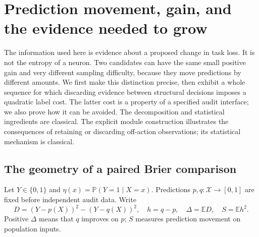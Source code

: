 \section{Prediction movement, gain, and the evidence needed to grow}
\label{sec:movement-theory}

The information used here is evidence about a proposed change in task loss.
It is not the entropy of a neuron. Two candidates can have the same small
positive gain and very different sampling difficulty, because they move
predictions by different amounts. We first make this distinction precise,
then exhibit a whole sequence for which discarding evidence between
structural decisions imposes a quadratic label cost. The latter cost is a
property of a specified audit interface; we also prove how it can be avoided.
The decomposition and statistical ingredients are classical. The explicit module construction illustrates the consequences of retaining
or discarding off-action observations; its statistical mechanism is classical.

\subsection{The geometry of a paired Brier comparison}

Let $Y\in\{0,1\}$ and $\eta(x)=\mathbb P(Y=1\mid X=x)$.
Predictions $p,q:\mathcal X\to[0,1]$ are fixed before independent audit data.
Write
\begin{equation}
 D=(Y-p(X))^2-(Y-q(X))^2,\quad h=q-p,\quad
 \Delta=\mathbb ED,\quad S=\mathbb E h^2.
 \label{eq:movement-def}
\end{equation}
Positive $\Delta$ means that $q$ improves on $p$; $S$ measures prediction
movement on population inputs.

